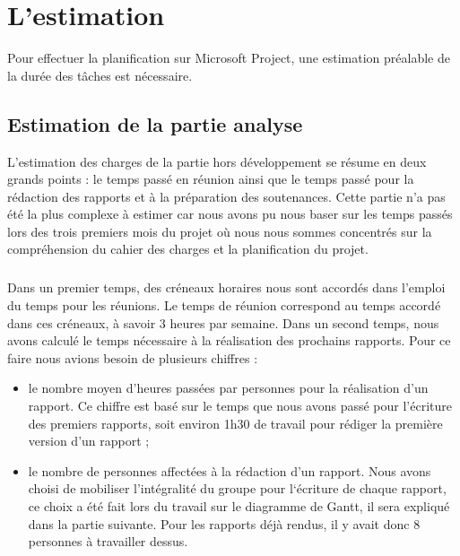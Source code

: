 
\chapter{L'estimation}

Pour effectuer la planification sur Microsoft Project, une estimation préalable de la durée des tâches est nécessaire. 

\section{Estimation de la partie analyse}

L’estimation des charges de la partie hors développement se résume en deux grands points : le temps passé en réunion ainsi que le temps passé pour la rédaction des rapports et à la préparation des soutenances. Cette partie n’a pas été la plus complexe à estimer car nous avons pu nous baser sur les temps passés lors des trois premiers mois du projet où nous nous sommes concentrés sur la compréhension du cahier des charges et la planification du projet.

\paragraph{}

Dans un premier temps, des créneaux horaires nous sont accordés dans l’emploi du temps pour les réunions. Le temps de réunion correspond au temps accordé dans ces créneaux, à savoir 3 heures par semaine. Dans un  second temps, nous avons calculé le temps nécessaire à la réalisation des prochains rapports.  Pour ce faire nous avions besoin de plusieurs chiffres :

\begin{itemize}
\item le nombre moyen d’heures passées par personnes pour la réalisation d’un rapport. Ce chiffre est basé sur le temps que nous avons passé pour l’écriture des premiers rapports, soit environ 1h30 de travail pour rédiger la première version d’un rapport ;
\item le nombre de personnes affectées à la rédaction d’un rapport. Nous avons choisi de mobiliser l’intégralité du groupe pour l‘écriture de chaque rapport, ce choix a été fait lors du travail sur le diagramme de Gantt, il sera expliqué dans la partie suivante. Pour les rapports déjà rendus, il y avait donc 8 personnes à travailler dessus.
\end{itemize}

\paragraph{}

